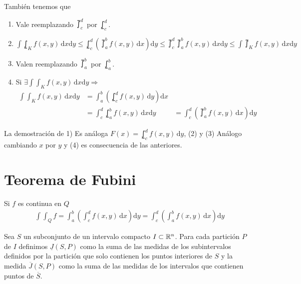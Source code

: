 \begin{note}
  También tenemos que

  \begin{enumerate}
    \item Vale reemplazando \(\upint_c^d\) por \(\lowint_c^d\).
    \item \(\int \lowint_K f(x, y) \, \mathrm{d}x \mathrm{d}y \leq \lowint_c^d ( \upint_a^b f(x, y)\, \mathrm{d}x ) \mathrm{d}y \leq \upint_c^d \upint_a^b f(x, y) \, \mathrm{d}x \mathrm{d}y \leq \int \upint_K f(x, y) \, \mathrm{d}x \mathrm{d}y\)
    \item Valen reemplazando \(\upint_a^b\) por \(\lowint_a^b\).
    \item Si \(\exists \int \int_K f(x, y) \, \mathrm{d}x \mathrm{d}y \Rightarrow \) \begin{align*}
            \int \int_K f(x, y) \, \mathrm{d}x \mathrm{d}y & = \int_a^b(\lowint_c^d f(x, y) \, \mathrm{d}y)\mathrm{d}x                                                           \\
                                                           & = \int_c^d \lowint_a^b f(x, y) \, \mathrm{d}x \mathrm{d}y & = \int_c^d(\upint_a^b f(x,y) \, \mathrm{d}x)\mathrm{d}y
          \end{align*}
  \end{enumerate}

  La demostración de 1) Es análoga \(F(x) = \lowint_c^d f(x, y) \, \mathrm{d}y\), (2) y (3) Análogo cambiando \(x\) por \(y\) y (4) es consecuencia de las anteriores.
\end{note}

\section{Teorema de Fubini}
\begin{corollary}[Fubini]
  Si \(f\) es continua en \(Q\) \begin{align*}
    \int\int_Q f = \int_a^b(\int_c^d f(x, y) \, \mathrm{d}x) \mathrm{d}y = \int_c^d(\int_a^b f(x, y)\, \mathrm{d}x)\mathrm{d}y
  \end{align*}
\end{corollary}

\begin{definition}
  Sea \(S\) un subconjunto de un intervalo compacto \(I \subset \mathbb{R}^n\). Para cada partición \(P\) de \(I\) definimos \(\underline{J}(S, P)\) como la suma de las medidas de los subintervalos definidos por la partición que solo contienen los puntos interiores de \(S\) y la medida \(\overline{J}(S, P)\) como la suma de las medidas de los intervalos que contienen puntos de \(\overline{S} \).
\end{definition}

